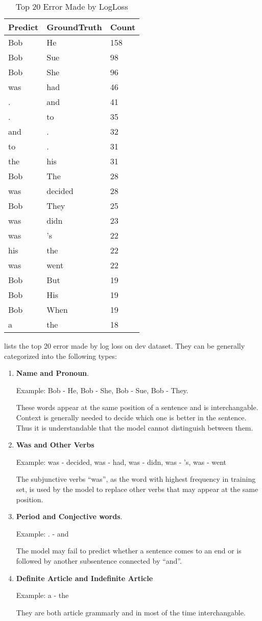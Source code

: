 \documentclass{article}
\begin{document}
\begin{table}
\centering
\begin{tabular}{l|l|l}
\textbf{Predict} & \textbf{GroundTruth} & \textbf{Count}\\
\hline
Bob&He&158\\
\hline
Bob&Sue&98\\
\hline
Bob&She&96\\
\hline
was&had&46\\
\hline
.&and&41\\
\hline
.&to&35\\
\hline
and&.&32\\
\hline
to&.&31\\
\hline
the&his&31\\
\hline
Bob&The&28\\
\hline
was&decided&28\\
\hline
Bob&They&25\\
\hline
was&didn&23\\
\hline
was&'s&22\\
\hline
his&the&22\\
\hline
was&went&22\\
\hline
Bob&But&19\\
\hline
Bob&His&19\\
\hline
Bob&When&19\\
\hline
a&the&18 \\
\end{tabular}
\caption{Top 20 Error Made by LogLoss}
\label{tab:logloss_top20}
\end{table}

 lists the top 20 error made by log loss on dev dataset. They can be generally categorized into the following types:
\begin{enumerate}
	\item \textbf{Name and Pronoun}. 

Example: Bob - He, Bob - She, Bob - Sue, Bob - They. 

These words appear at the same position of a sentence and is interchangable. Context is generally needed to decide which one is better in the sentence. Thus it is understandable that the model cannot distinguish between them.
	\item \textbf{Was and Other Verbs}

Example: was - decided, was - had, was - didn, was - 's, was - went

The subjunctive verbs ``was'', as the word with highest frequency in training set, is used by the model to replace other verbs that may appear at the same position.
	\item \textbf{Period and Conjective words}.

Example: . - and 

The model may fail to predict whether a sentence comes to an end or is followed by another subsentence connected by ``and''.

	\item \textbf{Definite Article and Indefinite Article} 

Example: a - the

They are both article grammarly and in most of the time interchangable. 
\end{enumerate}
\end{document}

